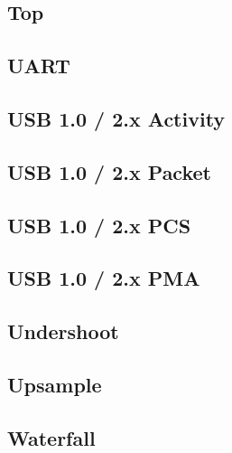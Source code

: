 \pagebreak
\subsection{Top}

\pagebreak
\subsection{UART}

\pagebreak
\subsection{USB 1.0 / 2.x Activity}

\pagebreak
\subsection{USB 1.0 / 2.x Packet}

\pagebreak
\subsection{USB 1.0 / 2.x PCS}

\pagebreak
\subsection{USB 1.0 / 2.x PMA}

\pagebreak
\subsection{Undershoot}

\pagebreak
\subsection{Upsample}

\pagebreak
\subsection{Waterfall}
